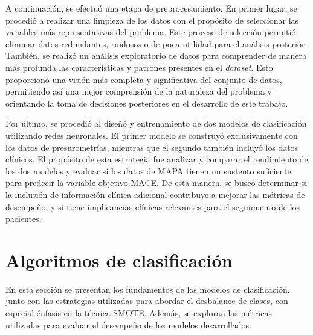 A continuación, se efectuó una etapa de preprocesamiento. En primer lugar, se procedió a realizar 
una limpieza de los datos con el propósito de seleccionar las variables más representativas del 
problema. Este proceso de selección permitió eliminar datos redundantes, ruidosos o de poca 
utilidad para el análisis posterior. También, se realizó un análisis exploratorio de datos 
para comprender de manera más profunda las características y patrones presentes en el \textit{dataset}. 
Esto proporcionó una visión más completa y significativa del conjunto de datos, permitiendo 
así una mejor comprensión de la naturaleza del problema y orientando la toma de decisiones 
posteriores en el desarrollo de este trabajo.

Por último, se procedió al diseñó y entrenamiento de dos modelos de clasificación utilizando 
redes neuronales. El primer modelo se construyó exclusivamente con los datos de presurometrías, 
mientras que el segundo también incluyó los datos clínicos. El propósito 
de esta estrategia fue analizar y comparar el rendimiento de los dos modelos y evaluar si los 
datos de MAPA tienen un sustento suficiente para predecir la variable objetivo MACE. De esta 
manera, se buscó determinar si la inclusión de información clínica adicional contribuye a 
mejorar las métricas de desempeño, y si tiene implicancias 
clínicas relevantes para el seguimiento de los pacientes.

\section{Algoritmos de clasificación}
\label{sec:Algoritmos de clasificación}

En esta sección se presentan los fundamentos de los modelos de clasificación, junto con las 
estrategias utilizadas para abordar el desbalance de clases, con especial énfasis en la técnica SMOTE. 
Además, se exploran las métricas utilizadas para evaluar el desempeño de los modelos desarrollados.


